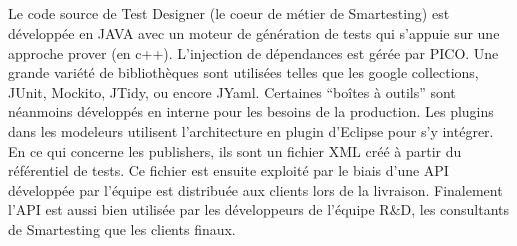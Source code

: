 \subparagraph*{}
Le code source de Test Designer (le coeur de métier de Smartesting) est développée en JAVA avec un moteur de génération de tests qui s'appuie sur une approche prover (en c++). L'injection de dépendances est gérée par PICO. Une grande variété de bibliothèques sont utilisées telles que les google collections, JUnit, Mockito, JTidy, ou encore JYaml. Certaines ``boîtes à outils'' sont néanmoins développés en interne pour les besoins de la production. Les plugins dans les modeleurs utilisent l'architecture en plugin d'Eclipse pour s'y intégrer. En ce qui concerne les publishers, ils sont un fichier XML créé à partir du référentiel de tests. Ce fichier est ensuite exploité par le biais d'une API développée par l'équipe est distribuée aux clients lors de la livraison. Finalement l'API est aussi bien utilisée par les développeurs de l'équipe R\&D, les consultants de Smartesting que les clients finaux.